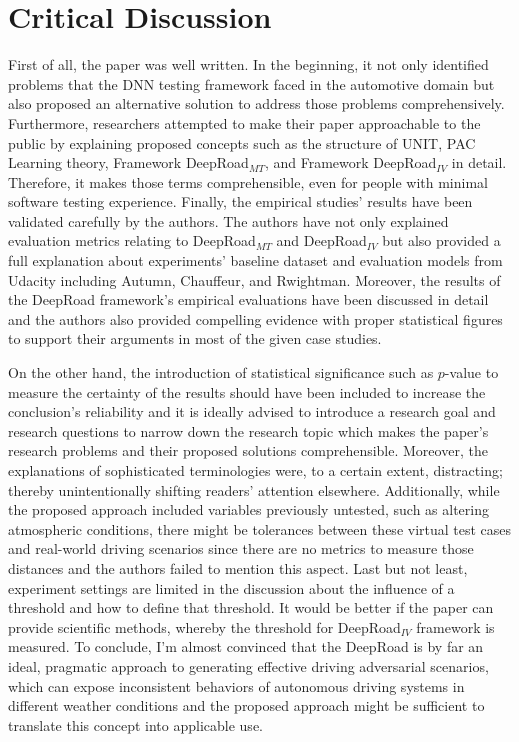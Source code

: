 \documentclass[10pt,a4paper]{report}
\begin{document}
\section{Critical Discussion}
First of all, the paper was well written. In the beginning, it not only identified problems that the DNN testing framework faced in the automotive domain but also proposed an alternative solution to address those problems comprehensively.
%
Furthermore, researchers attempted to make their paper approachable to the public by explaining proposed concepts such as the structure of UNIT, PAC Learning theory, Framework DeepRoad$_{MT}$, and Framework DeepRoad$_{IV}$ in detail. 
%
Therefore, it makes those terms comprehensible, even for people with minimal software testing experience.
%
Finally, the empirical studies' results have been validated carefully by the authors.
%
The authors have not only explained evaluation metrics relating to DeepRoad$_{MT}$ and DeepRoad$_{IV}$ but also provided a full explanation about experiments' baseline dataset and evaluation models from Udacity including Autumn, Chauffeur, and Rwightman.
%
Moreover, the results of the DeepRoad framework's empirical evaluations have been discussed in detail and the authors also provided compelling evidence with proper statistical figures to support their arguments in most of the given case studies.
%

On the other hand, the introduction of statistical significance such as $p$-value to measure the certainty of the results should have been included to increase the conclusion's reliability and it is ideally advised to introduce a research goal and research questions to narrow down the research topic which makes the paper's research problems and their proposed solutions comprehensible.
%
Moreover, the explanations of sophisticated terminologies were, to a certain extent, distracting; thereby unintentionally shifting readers' attention elsewhere.
%
Additionally, while the proposed approach included variables previously untested, such as altering atmospheric conditions, there might be tolerances between these virtual test cases and real-world driving scenarios since there are no metrics to measure those distances and the authors failed to mention this aspect.
%
Last but not least, experiment settings are limited in the discussion about the influence of a threshold and how to define that threshold.
%
It would be better if the paper can provide scientific methods, whereby the threshold for DeepRoad$_{IV}$ framework is measured.
%
To conclude, I’m almost convinced that the DeepRoad is by far an ideal, pragmatic approach to generating effective driving adversarial scenarios, which can expose inconsistent behaviors of autonomous driving systems in different weather conditions and the proposed approach might be sufficient to translate this concept into applicable use.
\end{document}
